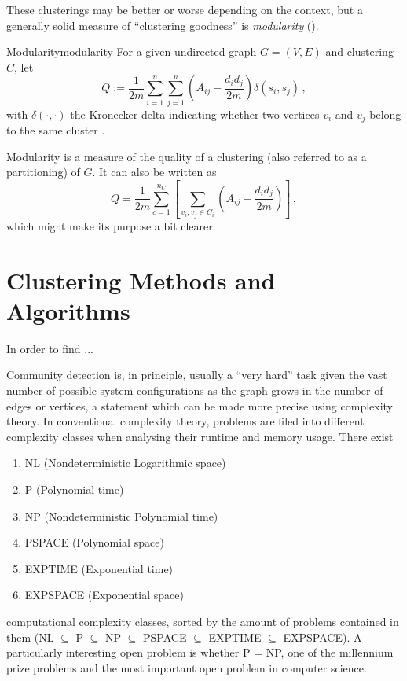 \documentclass[12pt, a4paper]{article}
\begin{document}
  These clusterings may be better or worse depending on the context, but a generally solid measure of ``clustering goodness'' is \textit{modularity} ().

  \begin{definition}{Modularity}{modularity}
    For a given undirected graph $G = (V, E)$ and clustering $C$, let $$Q := \frac{1}{2m} \sum_{i=1}^{n} \sum_{j=1}^{n} \left(A_{ij} - \frac{d_i d_j}{2m}\right) \delta(s_i, s_j)\,,$$ with $\delta(\cdot, \cdot)$ the Kronecker delta indicating whether two vertices $v_i$ and $v_j$ belong to the same cluster \parencite{lambiotte-louvain-clustering}.
  \end{definition}

  Modularity is a measure of the quality of a clustering (also referred to as a partitioning) of $G$. It can also be written as
  $$Q = \frac{1}{2m} \sum_{c=1}^{n_C} \left[\sum_{v_i, v_j \in C_i} \left(A_{ij} - \frac{d_i d_j}{2m}\right)\right]\,,$$
  which might make its purpose a bit clearer.

  \section{Clustering Methods and Algorithms}
  In order to find ...

  Community detection is, in principle, usually a ``very hard'' task given the vast number of possible system configurations as the graph grows in the number of edges or vertices, a statement which can be made more precise using complexity theory.
  In conventional complexity theory, problems are filed into different complexity classes when analysing their runtime and memory usage.
  There exist
  \begin{enumerate}[noitemsep,topsep=0pt,parsep=0pt,partopsep=0pt]
    \item NL (Nondeterministic Logarithmic space)
    \item P (Polynomial time)
    \item NP (Nondeterministic Polynomial time)
    \item PSPACE (Polynomial space)
    \item EXPTIME (Exponential time)
    \item EXPSPACE (Exponential space)
  \end{enumerate}
  computational complexity classes, sorted by the amount of problems contained in them (NL $\subseteq$ P $\subseteq$ NP $\subseteq$ PSPACE $\subseteq$ EXPTIME $\subseteq$ EXPSPACE).
  A particularly interesting open problem is whether P = NP, one of the millennium prize problems and the most important open problem in computer science.
\end{document}
